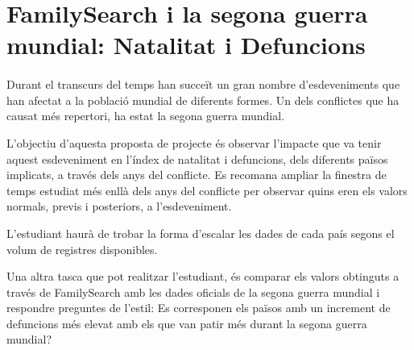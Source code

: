 \section{FamilySearch i la segona guerra mundial: Natalitat i Defuncions}

    \paragraph{}
    Durant el transcurs del temps han succeït un gran nombre d'esdeveniments que han afectat a la població mundial de diferents formes. Un dels conflictes que ha causat més repertori, ha estat la segona guerra mundial.

    L'objectiu d'aquesta proposta de projecte és observar l'impacte que va tenir aquest esdeveniment en l'índex de natalitat i defuncions, dels diferents països implicats, a través dels anys del conflicte. Es recomana ampliar la finestra de temps estudiat més enllà dels anys del conflicte per observar quins eren els valors normals, previs i posteriors, a l'esdeveniment.

    L'estudiant haurà de trobar la forma d'escalar les dades de cada país segons el volum de registres disponibles.

    Una altra tasca que pot realitzar l'estudiant, és comparar els valors obtinguts a través de FamilySearch amb les dades oficials de la segona guerra mundial i respondre preguntes de l'estil: Es corresponen els països amb un increment de defuncions més elevat amb els que van patir més durant la segona guerra mundial?

